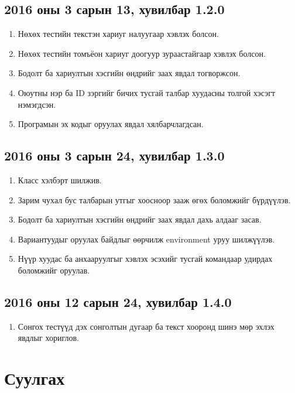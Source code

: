 \documentclass[10pt]{article}
\theoremstyle{definition}
\begin{document}
\subsection{2016 оны 3 сарын 13, хувилбар 1.2.0}

\begin{enumerate}
 \item Нөхөх тестийн текстэн хариуг налуугаар хэвлэх болсон.
 \item Нөхөх тестийн томъёон хариуг доогуур зураастайгаар хэвлэх болсон.
 \item Бодолт ба хариултын хэсгийн өндрийг заах явдал тогворжсон.
 \item Оюутны нэр ба ID зэргийг бичих тусгай талбар хуудасны толгой хэсэгт нэмэгдсэн.
 \item Програмын эх кодыг оруулах явдал хялбарчлагдсан.
\end{enumerate}

\subsection{2016 оны 3 сарын 24, хувилбар 1.3.0}

\begin{enumerate}
 \item Класс хэлбэрт шилжив.
 \item Зарим чухал бус талбарын утгыг хоосноор зааж өгөх боломжийг бүрдүүлэв.
 \item Бодолт ба хариултын хэсгийн өндрийг заах явдал дахь алдааг засав.
 \item Вариантуудыг оруулах байдлыг өөрчилж environment уруу шилжүүлэв.
 \item Нүүр хуудас ба анхааруулгыг хэвлэх эсэхийг тусгай командаар удирдах боломжийг оруулав.
\end{enumerate}

\subsection{2016 оны 12 сарын 24, хувилбар 1.4.0}

\begin{enumerate}
 \item Сонгох тестүүд дэх сонголтын дугаар ба текст хооронд шинэ мөр эхлэх явдлыг хориглов.
\end{enumerate}

\section{Суулгах}
\end{document}
